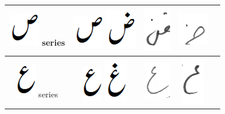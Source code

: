 \documentclass[a4paper,conference]{IEEEtran}
\begin{document}
\begin{table}[h]
\begin{tabular}{@{}ccccc@{}}
\includegraphics[scale=0.25]{Suad_orig} series & \includegraphics[scale=0.25]{Suad_orig} \includegraphics[scale=0.25]{zuad} & \includegraphics[scale=0.25]{15} &
\includegraphics[scale=0.25]{16} & \\ 
\hline
\includegraphics[scale=0.25]{Aien_orig} series & \includegraphics[scale=0.25]{Aien_orig} \includegraphics[scale=0.25]{ghen} & \includegraphics[scale=0.25]{17} &
\includegraphics[scale=0.20]{18} & \\ 

\end{tabular}
\end{table}
\end{document}
